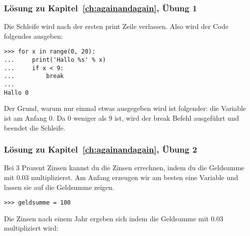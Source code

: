 \subsubsection{Lösung zu Kapitel~\ref{ch:againandagain}, Übung 1}
Die Schleife wird nach der ersten print Zeile verlassen. Also wird der Code folgendes ausgeben:

\begin{Verbatim}[frame=single]
>>> for x in range(0, 20):
...     print('Hallo %s' % x)
...     if x < 9:
...         break
...
Hallo 0
\end{Verbatim}

\noindent
Der Grund, warum nur einmal etwas ausgegeben wird ist folgender: die Variable  ist am Anfang 0. Da 0 weniger als 9 ist, wird der break Befehl ausgeführt und beendet die Schleife.

\noindent
\subsubsection{Lösung zu Kapitel~\ref{ch:againandagain}, Übung 2}
Bei 3 Prozent Zinsen kannst du die Zinsen errechnen, indem du die Geldsumme mit 0.03 multiplizierst. Am Anfang erzeugen wir am besten eine Variable und lassen sie auf die Geldsumme zeigen.

\begin{Verbatim}[frame=single]
>>> geldsumme = 100
\end{Verbatim}

Die Zinsen nach einem Jahr ergeben sich indem die Geldsumme mit 0.03 multipliziert wird:

